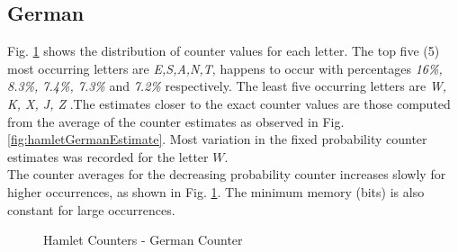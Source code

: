 \documentclass[longpaper, english, final, times]{revdetua}
\begin{document}
		\subsection{German}
			Fig. \ref{fig:hamletGermanCounter} shows the distribution of counter values for each letter. The top five (5) most occurring letters are \textit{E,S,A,N,T}, happens to occur with percentages \textit{16\%, 8.3\%, 7.4\%, 7.3\%} and  \textit{7.2\%} respectively. The least five occurring letters are \textit{W, K, X, J, Z} .The estimates closer to the exact counter values are those computed from the average of the counter estimates as observed in Fig. \ref{fig:hamletGermanEstimate}. Most variation in the fixed probability counter estimates was recorded for the letter $W$. \\
			
			The counter averages for the decreasing probability counter increases slowly for higher occurrences, as shown in Fig. \ref{fig:hamletGermanCounter}. The minimum memory (bits) is also constant for large occurrences.
			
			\begin{figure}[!h]
				\caption{Hamlet Counters - German Counter}
				\begin{center}
				\end{center}
				\label{fig:hamletGermanCounter}
			\end{figure}
		
\end{document}
